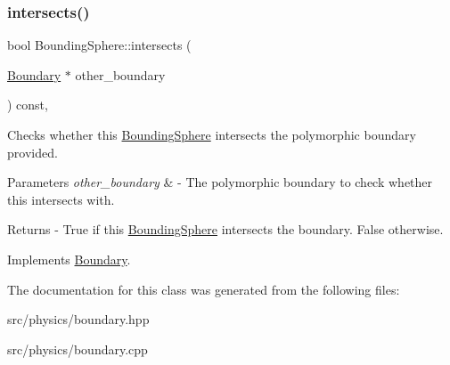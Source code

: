 \subsubsection{\texorpdfstring{intersects()}{intersects()}\hspace{0.1cm}{\footnotesize\ttfamily [2/2]}}
{\footnotesize\ttfamily bool Bounding\+Sphere\+::intersects (\begin{DoxyParamCaption}\item[{\mbox{\hyperlink{class_boundary}{Boundary}} $\ast$}]{other\+\_\+boundary }\end{DoxyParamCaption}) const\hspace{0.3cm}{\ttfamily [override]}, {\ttfamily [virtual]}}

Checks whether this \mbox{\hyperlink{class_bounding_sphere}{Bounding\+Sphere}} intersects the polymorphic boundary provided. 
\begin{DoxyParams}{Parameters}
{\em other\+\_\+boundary} & -\/ The polymorphic boundary to check whether this intersects with. \\
\hline
\end{DoxyParams}
\begin{DoxyReturn}{Returns}
-\/ True if this \mbox{\hyperlink{class_bounding_sphere}{Bounding\+Sphere}} intersects the boundary. False otherwise. 
\end{DoxyReturn}


Implements \mbox{\hyperlink{class_boundary_a364909bdfa4a4945f974c34a39e198cc}{Boundary}}.



The documentation for this class was generated from the following files\+:\begin{DoxyCompactItemize}
\item 
src/physics/boundary.\+hpp\item 
src/physics/boundary.\+cpp\end{DoxyCompactItemize}
